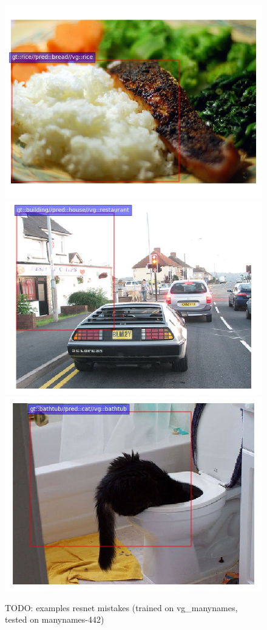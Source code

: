 \begin{figure}
	\centering
	\includegraphics[scale=.2]{images/2323938.jpg}
	\includegraphics[scale=.2]{images/2322259.jpg}
	\includegraphics[scale=.2]{images/2371657.jpg}
	
	\caption{TODO: examples resnet mistakes (trained on vg\_manynames, tested on manynames-442)\label{fig:mistakes} }
\end{figure}
\fi 
